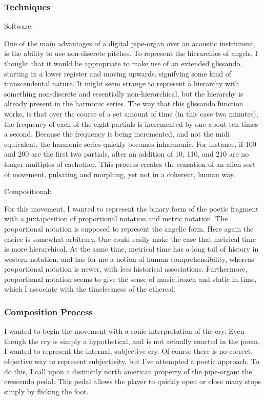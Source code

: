 \documentclass[12pt,twoside,maitrise]{dms}
\theoremstyle{definition}
\numberwithin{equation}{section}
\numberwithin{table}{chapter}
\numberwithin{figure}{chapter}
\begin{document}
\subsubsection{Techniques}

Software:

One of the main advantages of a digital pipe-organ over an acoustic instrument, is the ability to use non-discrete pitches. To represent the hierarchies of angels, I thought that it would be appropriate to make use of an extended glissando, starting in a lower register and moving upwards, signifying some kind of transcendental nature. It might seem strange to represent a hierarchy with something non-discrete and essentially non-hierarchical, but the hierarchy is already present in the harmonic series. The way that this glissando function works, is that over the course of a set amount of time (in this case two minutes), the frequency of each of the eight partials is incremented by one about ten times a second. Because the frequency is being incremented, and not the midi equivalent, the harmonic series quickly becomes inharmonic. For instance, if 100 and 200 are the first two partials, after an addition of 10, 110, and 210 are no longer multiples of eachother. This process creates the sensation of an alien sort of movement, pulsating and morphing, yet not in a coherent, human way.    

Compositional:

For this movement, I wanted to represent the binary form of the poetic fragment with a juxtaposition of proportional notation and metric notation.
The proportional notation is supposed to represent the angelic form.
Here again the choice is somewhat arbitrary.
One could easily make the case that metrical time is more hierarchical.
At the same time, metrical time has a long tail of history in western notation, and has for me a notion of human comprehensibility, whereas proportional notation is newer, with less historical associations.
Furthermore, proportional notation seems to give the sense of music frozen and static in time, which I associate with the timelessness of the ethereal.

\subsubsection{Composition Process}

I wanted to begin the movement with a sonic interpretation of the cry. Even though the cry is simply a hypothetical, and is not actually enacted in the poem, I wanted to represent the internal, subjective cry. Of course there is no correct, objective way to represent subjectivity, but I've attempted a poetic approach. To do this, I call upon a distinctly north american property of the pipe-organ: the crescendo pedal. This pedal allows the player to quickly open or close many stops simply by flicking the foot. 
\end{document}
